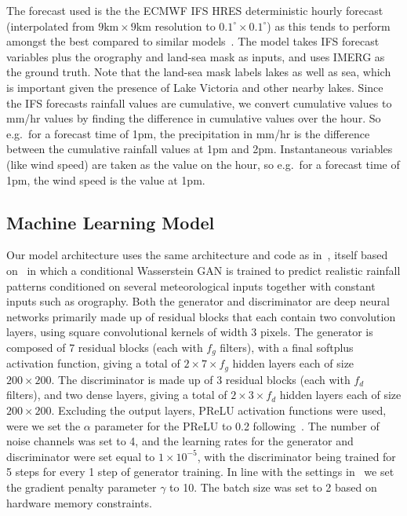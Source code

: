 \documentclass{article}
\begin{document}
The forecast used is the the ECMWF IFS HRES deterministic hourly forecast~\citep{ecmwf_operational_2023} (interpolated from $9\text{km} \times 9\text{km}$ resolution to $0.1^{\circ} \times 0.1^{\circ}$) as this tends to perform amongst the best compared to similar models~\citep{haiden_intercomparison_2012}. The model takes IFS forecast variables plus the orography and land-sea mask as inputs, and uses IMERG as the ground truth. Note that the land-sea mask labels lakes as well as sea, which is important given the presence of Lake Victoria and other nearby lakes. Since the IFS forecasts rainfall values are cumulative, we convert cumulative values to mm/hr values by finding the difference in cumulative values over the hour. So e.g.~for a forecast time of 1pm, the precipitation in mm/hr is the difference between the cumulative rainfall values at 1pm and 2pm. Instantaneous variables (like wind speed) are taken as the value on the hour, so e.g.~for a forecast time of 1pm, the wind speed is the value at 1pm. 



\subsection{Machine Learning Model}



Our model architecture uses the same architecture and code as in~\cite{harris_generative_2022}, itself based on~\cite{leinonen_stochastic_2020} in which a conditional Wasserstein GAN is trained to predict realistic rainfall patterns conditioned on several meteorological inputs together with constant inputs such as orography. Both the generator and discriminator are deep neural networks primarily made up of residual blocks that each contain two convolution layers, using square convolutional kernels of width 3 pixels. The generator is composed of 7 residual blocks (each with $f_g$ filters), with a final softplus activation function, giving a total of $2 \times 7 \times f_g$ hidden layers each of size $200 \times 200$. The discriminator is made up of 3 residual blocks (each with $f_d$ filters), and two dense layers, giving a total of $2 \times 3 \times f_d$ hidden layers each of size $200 \times 200$. 
Excluding the output layers, PReLU activation functions were used, were we set the $\alpha$ parameter for the PReLU to 0.2 following~\cite{harris_generative_2022}. The number of noise channels was set to 4, and the learning rates for the generator and discriminator were set equal to $1\times 10^{-5}$, with the discriminator being trained for 5 steps for every 1 step of generator training. In line with the settings in~\cite{gulrajani_improved_2017} we set the gradient penalty parameter $\gamma$ to 10. The batch size was set to 2 based on hardware memory constraints.
\end{document}
